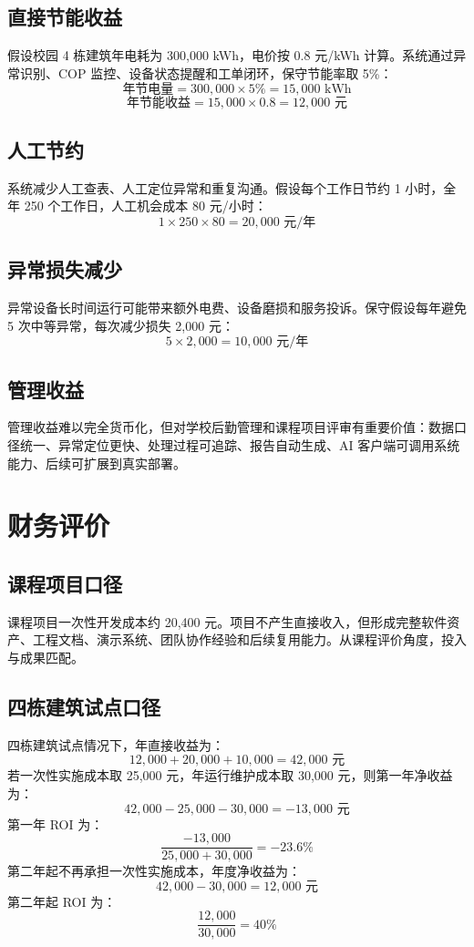 \documentclass[12pt,a4paper]{ctexart}
\begin{document}
\subsection{直接节能收益}
假设校园 4 栋建筑年电耗为 300,000 kWh，电价按 0.8 元/kWh 计算。系统通过异常识别、COP 监控、设备状态提醒和工单闭环，保守节能率取 5\%：
\[
\text{年节电量}=300,000 \times 5\% = 15,000 \text{ kWh}
\]
\[
\text{年节能收益}=15,000 \times 0.8 = 12,000 \text{ 元}
\]

\subsection{人工节约}
系统减少人工查表、人工定位异常和重复沟通。假设每个工作日节约 1 小时，全年 250 个工作日，人工机会成本 80 元/小时：
\[
1 \times 250 \times 80 = 20,000 \text{ 元/年}
\]

\subsection{异常损失减少}
异常设备长时间运行可能带来额外电费、设备磨损和服务投诉。保守假设每年避免 5 次中等异常，每次减少损失 2,000 元：
\[
5 \times 2,000 = 10,000 \text{ 元/年}
\]

\subsection{管理收益}
管理收益难以完全货币化，但对学校后勤管理和课程项目评审有重要价值：数据口径统一、异常定位更快、处理过程可追踪、报告自动生成、AI 客户端可调用系统能力、后续可扩展到真实部署。

\section{财务评价}
\subsection{课程项目口径}
课程项目一次性开发成本约 20,400 元。项目不产生直接收入，但形成完整软件资产、工程文档、演示系统、团队协作经验和后续复用能力。从课程评价角度，投入与成果匹配。

\subsection{四栋建筑试点口径}
四栋建筑试点情况下，年直接收益为：
\[
12,000 + 20,000 + 10,000 = 42,000 \text{ 元}
\]
若一次性实施成本取 25,000 元，年运行维护成本取 30,000 元，则第一年净收益为：
\[
42,000 - 25,000 - 30,000 = -13,000 \text{ 元}
\]
第一年 ROI 为：
\[
\frac{-13,000}{25,000 + 30,000} = -23.6\%
\]
第二年起不再承担一次性实施成本，年度净收益为：
\[
42,000 - 30,000 = 12,000 \text{ 元}
\]
第二年起 ROI 为：
\[
\frac{12,000}{30,000}=40\%
\]
\end{document}
